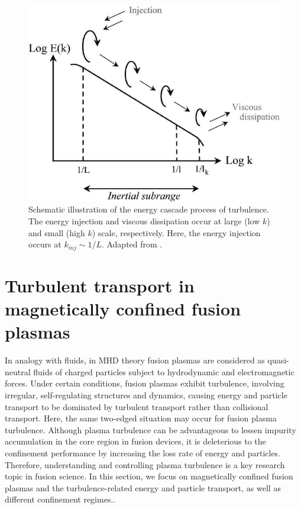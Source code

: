 \begin{figure}[h]
\begin{centering}
\includegraphics[scale=0.4]{energy_cascade.png}
\par\end{centering}
\caption[Schematic illustration of the energy cascade process of turbulence]{Schematic illustration of the energy cascade process of turbulence. The energy injection and viscous dissipation occur at large (low $k$) and small (high $k$) scale, respectively. Here, the energy injection occurs at $k_{inj} \sim 1/L$. Adapted from \cite{Frish_Cambridge_Turbulence}.}
\label{fig:energy_cascade}
\end{figure}


\section{Turbulent transport in magnetically confined fusion plasmas} \label{sec:turbulent_transport}

In analogy with fluids, in MHD theory fusion plasmas are considered as quasi-neutral fluids of charged particles subject to hydrodynamic and electromagnetic forces. Under certain conditions, fusion plasmas exhibit turbulence, involving irregular, self-regulating structures and dynamics, causing energy \cite{Wootton_1990_PoF, Rice_2012_PoP} and particle transport \cite{Angioni_PPCF_09_review_particle_transport} to be dominated by turbulent transport rather than collisional transport. Here, the same two-edged situation may occur for fusion plasma turbulence. Although plasma turbulence can be advantageous to lessen impurity accumulation in the core region in fusion devices, it is deleterious to the confinement performance by increasing the loss rate of energy and particles. Therefore, understanding and controlling plasma turbulence is a key research topic in fusion science. In this section, we focus on magnetically confined fusion plasmas and the turbulence-related energy and particle transport, as well as different confinement regimes..


